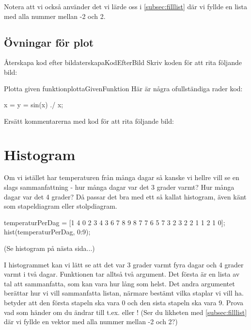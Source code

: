 Notera att vi också använder det vi lärde oss i \autoref{subsec:filllist} där vi fyllde en lista med alla nummer mellan -2 och 2.

\subsection{Övningar för plot}

\begin{matteovning}{Återskapa kod efter bild}{aterskapaKodEfterBild}
Skriv koden för att rita följande bild:

\end{matteovning}
\newpage
\begin{matteovning}{Plotta given funktion}{plottaGivenFunktion}
Här är några ofullständiga rader kod:
\vspace{10pt}
\begin{matlab}
x = %
y = sin(x) ./ x;
\end{matlab}
Ersätt kommentarerna med kod för att rita följande bild:

\end{matteovning}


\section{Histogram}

Om vi istället har temperaturen från många dagar så kanske vi hellre vill se en slags sammanfattning - hur många dagar var det 3 grader varmt? Hur många dagar var det 4 grader? Då passar det bra med ett så kallat histogram, även känt som stapeldiagram eller stolpdiagram.

\begin{matlab}[caption={Vårt första histogram},label={}]
temperaturPerDag = [1 4 0 2 3 4 3 6 7 8 9 8 7 7 6 5 7 3 2 3 2 2 1 1 2 1 0];
hist(temperaturPerDag, 0:9);
\end{matlab}
(Se histogram på nästa sida...)
\newpage
{}

I histogrammet kan vi lätt se att det var 3 grader varmt fyra dagar och 4 grader varmt i två dagar. Funktionen  tar alltså två argument. Det första är en lista av tal att sammanfatta, som kan vara hur lång som helst. Det andra argumentet berättar hur vi vill sammanfatta listan, närmare bestämt vilka staplar vi vill ha.  betyder att den första stapeln ska vara 0 och den sista stapeln ska vara 9. Prova vad som händer om du ändrar till t.ex.  eller ! (Ser du likheten med \autoref{subsec:filllist} där vi fyllde en vektor med alla nummer mellan -2 och 2?)

